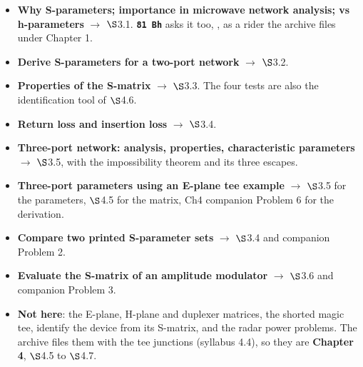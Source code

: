 \vspace{2pt}


\begin{itemize}
  \item \textbf{Why S-parameters; importance in microwave network analysis; vs
    h-parameters} $\rightarrow$ $\S$3.1.
    \textbf{\texttt{81 Bh}} asks it too, , as a rider the archive files under Chapter 1.
  \item \textbf{Derive S-parameters for a two-port network} $\rightarrow$ $\S$3.2.
  \item \textbf{Properties of the S-matrix} $\rightarrow$ $\S$3.3. The four tests are
    also the identification tool of $\S$4.6. 
  \item \textbf{Return loss and insertion loss} $\rightarrow$ $\S$3.4.
  \item \textbf{Three-port network: analysis, properties, characteristic parameters}
    $\rightarrow$ $\S$3.5, with the impossibility theorem and its three escapes.
  \item \textbf{Three-port parameters using an E-plane tee example} $\rightarrow$ $\S$3.5
    for the parameters, $\S$4.5 for the matrix, Ch4 companion Problem 6 for the derivation.
  \item \textbf{Compare two printed S-parameter sets} $\rightarrow$ $\S$3.4 and companion
    Problem 2. 
  \item \textbf{Evaluate the S-matrix of an amplitude modulator} $\rightarrow$ $\S$3.6 and
    companion Problem 3. \added{} 
  \item \textbf{Not here}: the E-plane, H-plane and duplexer matrices, the shorted magic
    tee, identify the device from its S-matrix, and the radar power problems. The archive
    files them with the tee junctions (syllabus 4.4), so they are \textbf{Chapter 4},
    $\S$4.5 to $\S$4.7.
\end{itemize}

